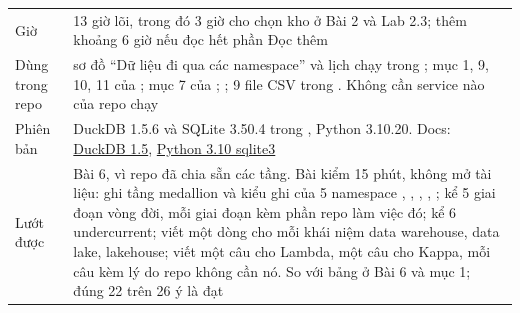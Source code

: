 
\begin{xltabular}{\textwidth}{@{}P{3.4cm} L@{}}
\toprule
{} &  \\
\midrule
\endhead
\bottomrule
\endfoot
Giờ & 13 giờ lõi, trong đó 3 giờ cho chọn kho ở Bài 2 và Lab 2.3; thêm khoảng 6 giờ nếu đọc hết phần Đọc thêm \\
Dùng trong repo & sơ đồ ``Dữ liệu đi qua các namespace'' và lịch chạy trong ; mục 1, 9, 10, 11 của ; mục 7 của ; ; 9 file CSV trong . Không cần service nào của repo chạy \\
Phiên bản & DuckDB 1.5.6 và SQLite 3.50.4 trong , Python 3.10.20. Docs: \href{https://duckdb.org/docs/1.5/}{DuckDB 1.5}, \href{https://docs.python.org/3.10/library/sqlite3.html}{Python 3.10 sqlite3} \\
Lướt được & Bài 6, vì repo  đã chia sẵn các tầng. Bài kiểm 15 phút, không mở tài liệu: ghi tầng medallion và kiểu ghi của 5 namespace , , , , ; kể 5 giai đoạn vòng đời, mỗi giai đoạn kèm phần repo làm việc đó; kể 6 undercurrent; viết một dòng cho mỗi khái niệm data warehouse, data lake, lakehouse; viết một câu cho Lambda, một câu cho Kappa, mỗi câu kèm lý do repo không cần nó. So với bảng ở Bài 6 và  mục 1; đúng 22 trên 26 ý là đạt \\
\end{xltabular}

